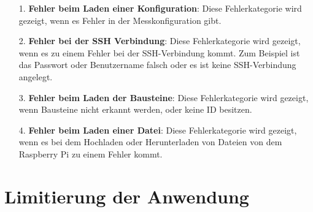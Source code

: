 \documentclass[parskip=full]{scrartcl}
\begin{document}
\begin{itemize}


\item[1.] \textbf{Fehler beim Laden einer Konfiguration}: Diese Fehlerkategorie wird gezeigt, wenn es Fehler in der Messkonfiguration gibt.

\item[2.] \textbf{Fehler bei der SSH Verbindung}: Diese Fehlerkategorie wird gezeigt, wenn es zu einem Fehler bei der SSH-Verbindung kommt. Zum Beispiel ist das Passwort oder Benutzername falsch oder es ist keine SSH-Verbindung angelegt.

\item[3.] \textbf{Fehler beim Laden der Bausteine}: Diese Fehlerkategorie wird gezeigt, wenn Bausteine nicht erkannt werden, oder keine ID besitzen.

\item[4.] \textbf{Fehler beim Laden einer Datei}: Diese Fehlerkategorie wird gezeigt, wenn es bei dem Hochladen oder Herunterladen von Dateien von dem Raspberry Pi zu einem Fehler kommt.

\end{itemize}

\section{Limitierung der Anwendung}


\printnoidxglossaries				%
\end{document}
